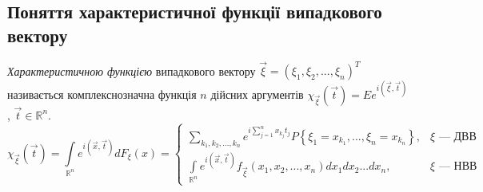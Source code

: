 \subsection{Поняття характеристичної функції випадкового вектору}
\begin{definition}
    \emph{Характеристичною функцією} випадкового вектору $\vec{\xi} = \left( \xi_1, \xi_2, ..., \xi_n\right)^T$ 
    називається комплекснозначна функція $n$ дійсних аргументів $\chi_{\vec{\xi}}(\vec{t}) = Ee^{i(\vec{\xi}, \vec{t})}$, $\vec{t} \in \mathbb{R}^n$.
    \begin{equation}\label{eq:char_func_vect}
        \chi_{\vec{\xi}}(\vec{t}) = \int\limits_{\mathbb{R}^n} e^{i(\vec{x}, \vec{t})} dF_\xi(x) = \begin{cases}
            \sum\limits_{k_1,k_2, ..., k_n} e^{i \sum\limits_{j=1}^n x_{k_j}t_j} P\left\{\xi_1 = x_{k_1}, ..., \xi_n = x_{k_n}\right\}, & \xi \text{ --- ДВВ} \\
            \int\limits_{\mathbb{R}^n} e^{i(\vec{x}, \vec{t})} f_{\vec{\xi}}(x_1, x_2, ..., x_n)dx_1 dx_2 ... dx_n, & \xi \text{ --- НВВ}
        \end{cases}
    \end{equation}
\end{definition}

